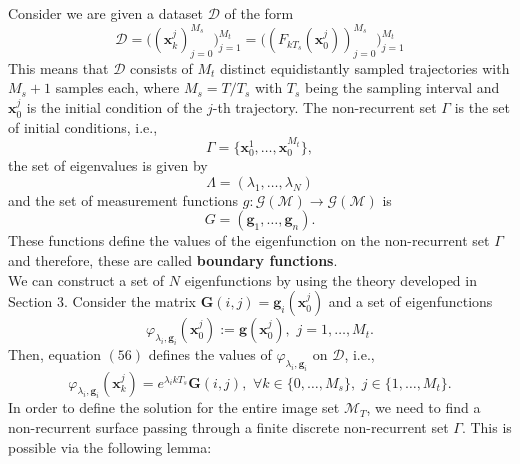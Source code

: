 \documentclass[]{article}
\begin{document}
Consider we are given a dataset $\mathcal{D}$ of the form
\begin{equation}
	\mathcal{D}=\bigg((\textbf{x}_k^j)_{j=0}^{M_s}\bigg)_{j=1}^{M_t} = \bigg((F_{kT_s}(\textbf{x}_0^j))_{j=0}^{M_s}\bigg)_{j=1}^{M_t}
\end{equation}
This means that $\mathcal{D}$ consists of $M_t$ distinct equidistantly sampled trajectories with $M_s+1$ samples each, where $M_s=T/T_s$ with $T_s$ being the sampling interval and $\textbf{x}_0^j$ is the initial condition of the $j$-th trajectory. The non-recurrent set $\Gamma$ is the set of initial conditions, i.e.,
\begin{equation}
	\Gamma = \{\textbf{x}_0^1,\dots,\textbf{x}_0^{M_t}\},
\end{equation}
the set of eigenvalues is given by
\begin{equation}
	\Lambda = (\lambda_1,\dots,\lambda_N)
\end{equation}
and the set of measurement functions $g:\mathcal{G}(\mathcal{M}) \to \mathcal{G}(\mathcal{M})$ is 
\begin{equation}
	G=(\textbf{g}_1,\dots,\textbf{g}_n).
\end{equation}
These functions define the values of the eigenfunction on the non-recurrent set $\Gamma$ and therefore, these are called \textbf{boundary functions}. \\ 
We can construct a set of $N$ eigenfunctions by using the theory developed in Section $3$. Consider the matrix $\textbf{G}(i,j)=\textbf{g}_i(\textbf{x}_0^j)$ and a set of eigenfunctions
\begin{equation}
	\varphi_{\lambda_i,\textbf{g}_i}(\textbf{x}_0^j) := \textbf{g}(\textbf{x}_0^j), \,\, j=1,\dots,M_t.
\end{equation}
Then, equation $(56)$ defines the values of $\varphi_{\lambda_i,\textbf{g}_i}$ on $\mathcal{D}$, i.e.,
\begin{equation}
	\varphi_{\lambda_i,\textbf{g}_i}(\textbf{x}_k^j) = e^{\lambda_i k T_s}\textbf{G}(i,j), \,\, \forall k \in \{0,\dots,M_s\}, \,\, j \in \{1,\dots,M_t\}.
\end{equation}
In order to define the solution for the entire image set $\mathcal{M}_T$, we need to find a non-recurrent surface passing through a finite discrete non-recurrent set $\Gamma$. This is possible via the following lemma:
\end{document}

